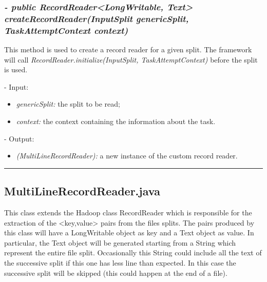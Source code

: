 \documentclass[]{report}
\begin{document}
	\subsubsection*{\textit{\textbf{-} 	public RecordReader<LongWritable, Text> createRecordReader(InputSplit genericSplit, TaskAttemptContext context)}}   	
	This method is used to create a record reader for a given split. The framework will call \textit{RecordReader.initialize(InputSplit, TaskAttemptContext)} before the split is used.   
	\begin{description}
		\item - Input:
		\begin{itemize}
			\item \textit{genericSplit:} the split to be read;
			\item \textit{context:} the context containing the information about the task.
		\end{itemize}
	\end{description}	
	\begin{description}
		\item - Output:
		\begin{itemize}
			\item \textit{(MultiLineRecordReader):} a new instance of the custom record reader. 
		\end{itemize}
	\end{description}
	
	\rule{\textwidth}{0.4pt}
	
	\subsection*{MultiLineRecordReader.java}
	This class extends the Hadoop class RecordReader which is responsible for the extraction of the <key,value> pairs from the files splits. The pairs produced by this class will have a LongWritable object as key and a Text object as value. In particular, the Text object will be generated starting from a String which represent the entire file split. Occasionally this String could include all the text of the successive split if this one has less line than expected. In this case the successive split will be skipped (this could happen at the end of a file). 
	
\end{document}
